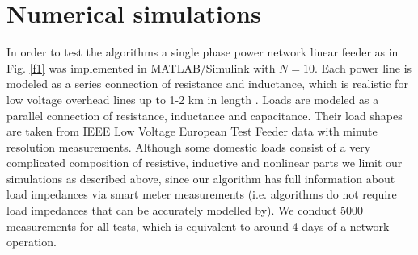 \documentclass[journal,10pt,onecolumn,draftclsnofoot,]{IEEEtran}
\theoremstyle{plain}
\theoremstyle{definition}
\theoremstyle{remark}
\begin{document}
\section{Numerical simulations}
\label{num_sim_section}
In order to test the algorithms a single phase power network linear feeder as in Fig. \ref{f1} was implemented in MATLAB/Simulink with $N = 10$. Each power line is modeled as a series connection of resistance and inductance, which is realistic for low voltage overhead lines up to 1-2 km in length \cite{glover2012power}. Loads are modeled as a parallel connection of resistance, inductance and capacitance. Their load shapes are taken from IEEE Low Voltage European Test Feeder data with minute resolution measurements. Although some domestic loads consist of a very complicated composition of resistive, inductive and nonlinear parts \cite{barker2013empirical, pipattanasomporn2014load} we limit our simulations as described above, since our algorithm has full information about load impedances via smart meter measurements (i.e. algorithms do not require load impedances that can be accurately modelled by). We conduct 5000 measurements for all tests, which is equivalent to around 4 days of a network operation.
\end{document}
